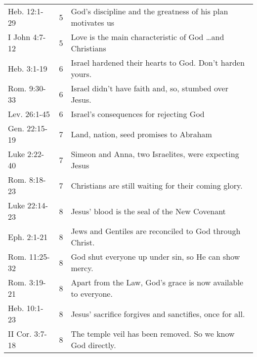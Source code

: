 \begin{table}[h]
\begin{tabular}{llp{11cm}}
Heb. 12:1-29   & 5 & God's discipline and the greatness of his plan motivates us\\
I John 4:7-12  & 5 & Love is the main characteristic of God \ldots and Christians\\
Heb. 3:1-19    & 6 & Israel hardened their hearts to God.  Don't harden yours.\\
Rom. 9:30-33   & 6 & Israel didn't have faith and, so, stumbed over Jesus.\\
Lev. 26:1-45   & 6 & Israel's consequences for rejecting God\\
Gen. 22:15-19  & 7 & Land, nation, seed promises to Abraham\\
Luke 2:22-40   & 7 & Simeon and Anna, two Israelites, were expecting Jesus\\
Rom. 8:18-23   & 7 & Christians are still waiting for their coming glory.\\
Luke 22:14-23  & 8 & Jesus' blood is the seal of the New Covenant\\
Eph. 2:1-21    & 8 & Jews and Gentiles are reconciled to God through Christ.\\
Rom. 11:25-32  & 8 & God shut everyone up under sin, so He can show mercy.\\
Rom. 3:19-21   & 8 & Apart from the Law, God's grace is now available to everyone.\\
Heb. 10:1-23   & 8 & Jesus' sacrifice forgives and sanctifies, once for all.\\
II Cor. 3:7-18 & 8 & The temple veil has been removed.  So we know God directly.\\
\bottomrule
\end{tabular}
\label{tab:ScriptureReference}
\end{table}
